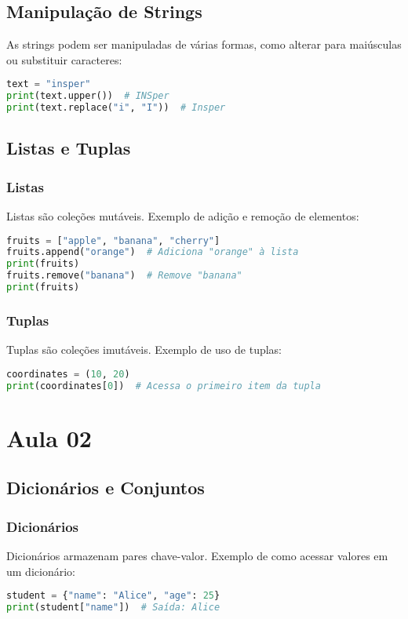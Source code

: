 \documentclass{sciposter}
\begin{document}
\begin{multicols}{3}
\subsection{Manipulação de Strings}
As strings podem ser manipuladas de várias formas, como alterar para maiúsculas ou substituir caracteres:
\begin{lstlisting}[language=Python]
text = "insper"
print(text.upper())  # INSper
print(text.replace("i", "I"))  # Insper
\end{lstlisting}

\subsection{Listas e Tuplas}
\subsubsection{Listas}
Listas são coleções mutáveis. Exemplo de adição e remoção de elementos:
\begin{lstlisting}[language=Python]
fruits = ["apple", "banana", "cherry"]
fruits.append("orange")  # Adiciona "orange" à lista
print(fruits)
fruits.remove("banana")  # Remove "banana"
print(fruits)
\end{lstlisting}

\subsubsection{Tuplas}
Tuplas são coleções imutáveis. Exemplo de uso de tuplas:
\begin{lstlisting}[language=Python]
coordinates = (10, 20)
print(coordinates[0])  # Acessa o primeiro item da tupla
\end{lstlisting}

\section{Aula 02}

\subsection{Dicionários e Conjuntos}
\subsubsection{Dicionários}
Dicionários armazenam pares chave-valor. Exemplo de como acessar valores em um dicionário:
\begin{lstlisting}[language=Python]
student = {"name": "Alice", "age": 25}
print(student["name"])  # Saída: Alice
\end{lstlisting}


\end{multicols}
\end{document}
